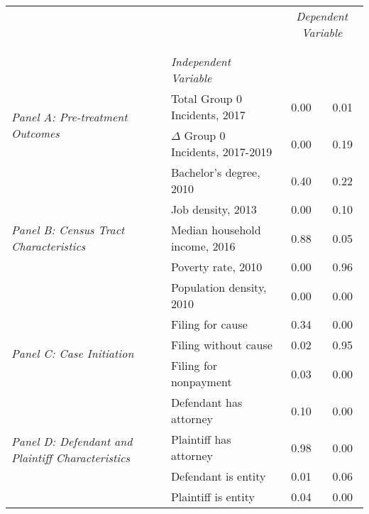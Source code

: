 \begin{tabular}{llcc}
\toprule
 &  & \multicolumn{2}{c}{\textit{Dependent Variable}} \\
\cline{3-4}
\\
 &  &  &  \\
 & \emph{Independent Variable} &  &  \\
\midrule
\multirow[c]{2}{3cm}{\textit{Panel A: Pre-treatment Outcomes}} & Total Group 0 Incidents, 2017 & 0.00 & 0.01 \\
 & $\Delta$ Group 0 Incidents, 2017-2019 & 0.00 & 0.19 \\
\cline{1-4}
\multirow[c]{5}{3cm}{\textit{Panel B: Census Tract Characteristics}} & Bachelor's degree, 2010 & 0.40 & 0.22 \\
 & Job density, 2013 & 0.00 & 0.10 \\
 & Median household income, 2016 & 0.88 & 0.05 \\
 & Poverty rate, 2010 & 0.00 & 0.96 \\
 & Population density, 2010 & 0.00 & 0.00 \\
\cline{1-4}
\multirow[c]{3}{3cm}{\textit{Panel C: Case Initiation}} & Filing for cause & 0.34 & 0.00 \\
 & Filing without cause & 0.02 & 0.95 \\
 & Filing for nonpayment & 0.03 & 0.00 \\
\cline{1-4}
\multirow[c]{4}{3cm}{\textit{Panel D: Defendant and Plaintiff Characteristics}} & Defendant has attorney & 0.10 & 0.00 \\
 & Plaintiff has attorney & 0.98 & 0.00 \\
 & Defendant is entity & 0.01 & 0.06 \\
 & Plaintiff is entity & 0.04 & 0.00 \\
\cline{1-4}
\bottomrule
\end{tabular}
